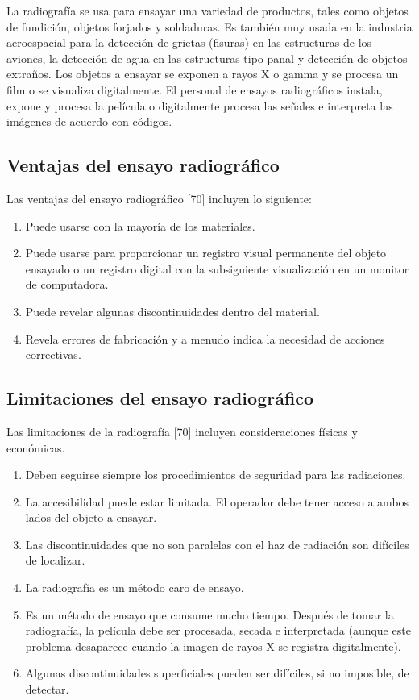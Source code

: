 La radiografía se usa para ensayar una variedad de productos, tales como objetos de fundición, objetos forjados y soldaduras. Es también muy usada en la industria aeroespacial para la detección de grietas (fisuras) en las estructuras de los aviones, la detección de agua en las estructuras tipo panal y detección de objetos extraños. Los objetos a ensayar se exponen a rayos X o gamma y se procesa un film o se visualiza digitalmente. El personal de ensayos radiográficos instala, expone y procesa la película o digitalmente procesa las señales e interpreta las imágenes de acuerdo con códigos.

\subsection{Ventajas del ensayo radiográfico}
Las ventajas del ensayo radiográfico [70] incluyen lo siguiente:

\begin{enumerate}
\item Puede usarse con la mayoría de los materiales.
\item Puede usarse para proporcionar un registro visual permanente del objeto ensayado o un registro digital con la subsiguiente visualización en un monitor de computadora.
\item Puede revelar algunas discontinuidades dentro del material.
\item Revela errores de fabricación y a menudo indica la necesidad de acciones correctivas.
\end{enumerate}

\subsection{Limitaciones del ensayo radiográfico}
Las limitaciones de la radiografía [70] incluyen consideraciones físicas y económicas.

\begin{enumerate}
\item Deben seguirse siempre los procedimientos de seguridad para las radiaciones.
\item La accesibilidad puede estar limitada. El operador debe tener acceso a ambos lados del objeto a ensayar.
\item Las discontinuidades que no son paralelas con el haz de radiación son difíciles de localizar.
\item La radiografía es un método caro de ensayo.
\item Es un método de ensayo que consume mucho tiempo. Después de tomar la radiografía, la película debe ser procesada, secada e interpretada (aunque este problema desaparece cuando la imagen de rayos X se registra digitalmente).
\item Algunas discontinuidades superficiales pueden ser difíciles, si no imposible, de detectar.
\end{enumerate}

